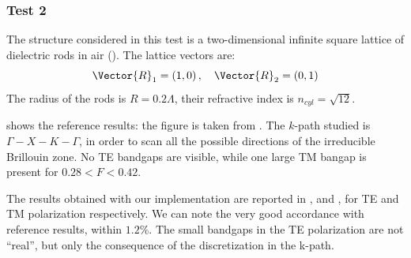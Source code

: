 \subsubsection{Test 2}

The structure considered in this test is a two-dimensional infinite
square lattice of dielectric rods in air
(). The lattice vectors are:
\begin{equation*}
  \Vector{R}_1 = \left(1,0\right), \quad \Vector{R}_2 =
  \left(0,1\right)
\end{equation*}
The radius of the rods is $R = 0.2 \Lambda$, their refractive index is
$n_{cyl} = \sqrt{12}$.

 shows the reference results: the figure is
taken from \cite{johnson_photonic}. The $k$-path studied is
$\Gamma-X-K-\Gamma$, in order to scan all the possible directions of
the irreducible Brillouin zone. No TE bandgaps are visible, while one
large TM bangap is present for $0.28 < F < 0.42$.

The results obtained with our implementation are reported in
,  and , for TE and TM
polarization respectively. We can note the very good accordance with
reference results, within $1.2\%$. The small bandgaps in the TE
polarization are not ``real'', but only the consequence of the
discretization in the k-path.


